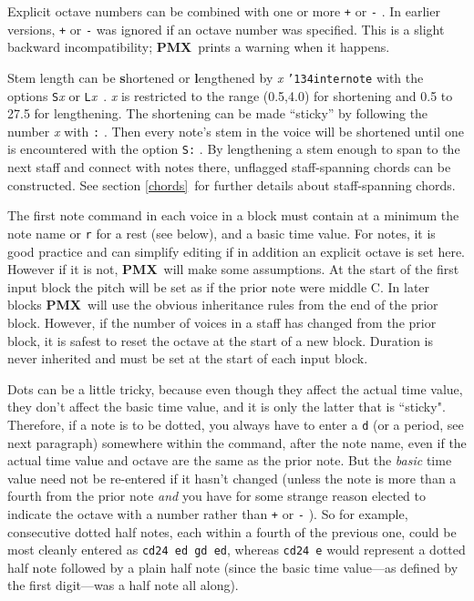 \documentclass[11pt]{article}
\def\bs{{\tt\char'134}}
\newcommand\PMXX{\textbf{PMX}}
\newcommand\PMX{\PMXX~}
\def\newfrom{2.59}  %
\def\NEW#1{\ifdim#1 pt<\newfrom pt\else%
\marginpar{\fbox{#1}}\fi}
\begin{document}
	Explicit octave \NEW{2.1} numbers can be combined with one or
more {\tt +} or {\tt -} .  In earlier versions, {\tt +} or {\tt -} was
ignored if an octave number was specified.  This is a slight backward 
incompatibility; \PMX prints a warning when it happens.

\label{Stemlength}Stem length \NEW{2.73} can be {\bf s}hortened or {\bf l}engthened by {\it x} 
\bs{\tt internote} with the options {\tt S}{\it x} or {\tt L}{\it x}~. 
{\it x} is restricted to the range (0.5,4.0) for shortening and 0.5 to 27.5 
for lengthening.
The shortening can be made ``sticky'' by following the number {\it x} with 
{\tt :} . Then every note's stem in the voice will be shortened until 
one is encountered with the option {\tt S:} . By lengthening a stem enough 
to span to the next staff and connect with notes there, unflagged staff-spanning 
chords can be constructed. See section \ref{chords}~for further details 
about staff-spanning chords.

The first note command in each voice in a block must 
contain at a minimum the note name or {\tt r} for a rest (see below), 
and a basic time value.  For notes, it is good practice and can simplify 
editing
if in addition an explicit octave is set here.  However if it is not, 
\PMX will make some assumptions.  At \NEW{2.4} the start of the first 
input block the pitch will be set as if the prior note were middle C.
In later blocks \PMX will use the
obvious inheritance rules from the end of the prior block.  
However, if the number of voices in a staff  
has changed from the prior block, it is safest to reset the octave at the
start of a new block.  Duration is never inherited and must be set at the
start of each input block.   

	Dots can be a little tricky, because even though they affect the 
actual time value, they don't affect the basic time value, and it is only the
latter that is ``sticky".  Therefore, if a note is to be dotted, you always have to 
enter a {\tt d} (or a period, see next paragraph) somewhere within the 
command, after 
the note name, even if the actual time value and octave are the same 
as the prior note.  But the {\it basic} time value need not be re-entered if 
it hasn't changed (unless the note is more than a fourth from the 
prior note {\it and} you have for some strange reason elected to indicate the 
octave with a number rather than {\tt +} or {\tt -} ). So for example, 
consecutive dotted half notes, each within a fourth of the previous 
one, could be most cleanly entered as {\tt cd24 ed gd ed}, whereas {\tt cd24 e}
would represent a dotted half note followed by a plain half note 
(since the basic time value---as defined by the first digit---was a half 
note all along).
\end{document}
